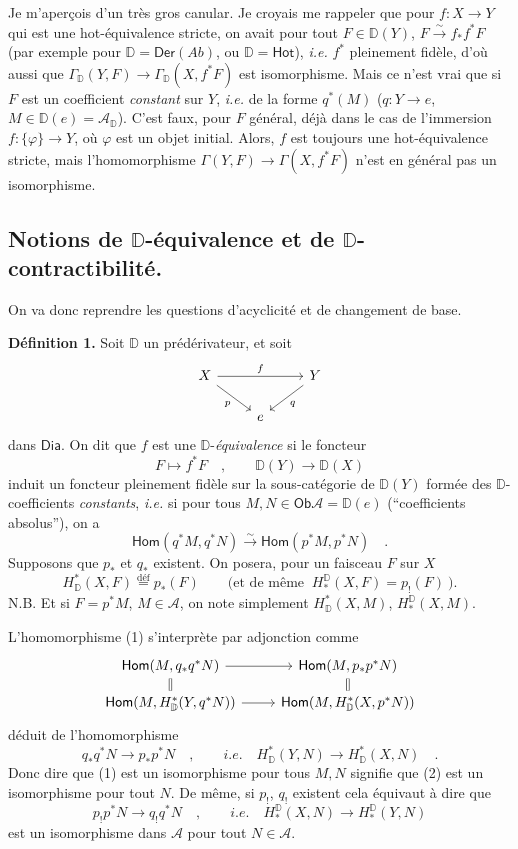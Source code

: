 \documentclass[11pt]{article}
\newcommand{\printedpage}[1]{\marginpar{\footnotesize p.~#1}}
\newcommand{\msp}[1]{\marginpar{\footnotesize [#1]}}
\newcommand{\Ob}{\mathsf{Ob}}
\newcommand{\Dia}{\mathsf{Dia}}
\newcommand{\DD}{\mathbb{D}}
\newcommand{\sHom}{\mathsf{Hom}}
\newcommand{\cA}{\mathcal{A}}
\newcommand{\Hot}{\mathsf{Hot}}
\newcommand{\isoto}{\overset{\sim}{\to}}
\newcommand{\isolongto}{\overset{\sim}{\longrightarrow}}
\begin{document}
Je m'aperçois d'un très gros canular. Je croyais me rappeler que pour $f : X \to Y$ qui est une hot-équivalence stricte, on avait pour tout $F \in \DD(Y)$, $F \isoto f_*f^*F$ (par exemple pour $\DD = \mathsf{Der}(\mathit{Ab})$, ou $\DD = \Hot$), \textit{i.e.} $f^*$ pleinement fidèle, d'où aussi que $\Gamma_{\DD}(Y, F) \to \Gamma_{\DD}(X, f^*F)$ est isomorphisme. Mais ce n'est vrai que si $F$ est un coefficient \textit{constant} sur $Y$, \textit{i.e.} de la forme $q^*(M)$ ($q : Y \to e$, $M \in \DD(e) = \cA_{\DD}$). C'est faux, pour $F$ général, déjà dans le cas de l'immersion $f : \{\varphi\} \to Y$, où $\varphi$ est un objet initial. Alors, $f$ est toujours une hot-équivalence stricte, mais l'homomorphisme $\Gamma(Y, F) \to \Gamma(X, f^*F)$ n'est en général pas un isomorphisme.

\clearpage
\printedpage{35}
\noindent\msp{page 61}

\subsection*{Notions de $\mathbb{D}$-équivalence et de $\mathbb{D}$-contractibilité.}

On va donc reprendre les questions d'acyclicité et de changement de base.

\noindent\textbf{Définition 1.} Soit $\DD$ un prédérivateur, et soit
\[
\begin{tikzcd}
X \arrow[rr, "f"] \arrow[dr, "p"'] & & Y \arrow[dl, "q"] \\
& e &
\end{tikzcd}
\]
dans $\Dia$. On dit que $f$ est une $\DD$-\textit{équivalence} si le foncteur
\[
F \longmapsto f^*F \quad , \qquad \DD(Y) \longrightarrow \DD(X)
\]
induit un foncteur pleinement fidèle sur la sous-catégorie de $\DD(Y)$ formée des $\DD$-coefficients \textit{constants}, \textit{i.e.} si pour tous $M, N \in \Ob \cA = \DD(e)$ (“coefficients absolus”), on a
\[
\sHom(q^*M, q^*N) \isolongto \sHom(p^*M, p^*N) \quad . \tag*{(1)}
\]
Supposons que $p_*$ et $q_*$ existent. On posera, pour un faisceau $F$ sur $X$
\[
H^*_{\DD}(X, F) \overset{\text{déf}}{=} p_*(F) \qquad \text{(et de même } \ H^{\DD}_*(X, F) = p_!(F) \ \text{).}
\]
N.B. Et si $F = p^*M$, $M \in \cA$, on note simplement $H^*_{\DD}(X, M)$, $H^{\DD}_*(X, M)$.

\noindent L'homomorphisme (1) s'interprète par adjonction comme
\[
\begin{tikzcd}[row sep=small]
\sHom(M, q_*q^*N) \arrow[r] \arrow[d, equal] & \sHom(M, p_*p^*N) \arrow[d, equal] \\
\sHom(M, H^*_{\DD}(Y, q^*N)) \arrow[r] & \sHom(M, H^*_{\DD}(X, p^*N))
\end{tikzcd}
\]
déduit de l'homomorphisme
\[
q_*q^*N \longrightarrow p_*p^*N \quad , \qquad \textit{i.e.} \quad H^*_{\DD}(Y, N) \longrightarrow H^*_{\DD}(X, N) \quad . \tag*{(2)}
\]
Donc dire que (1) est un isomorphisme pour tous $M, N$ signifie que (2) est un isomorphisme pour tout $N$. De même, si $p_!$, $q_!$ existent cela équivaut à dire que
\[
p_!p^*N \longrightarrow q_!q^*N \quad , \qquad \textit{i.e.} \quad H^{\DD}_*(X, N) \longrightarrow H^{\DD}_*(Y, N) \tag*{$(2')$}
\]
est un isomorphisme dans $\cA$ pour tout $N \in \cA$.
\end{document}
